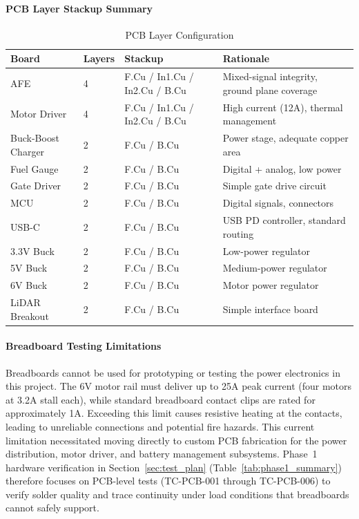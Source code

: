 \paragraph{PCB Layer Stackup Summary}
\begin{table}[H]
\centering
\caption{PCB Layer Configuration}
\label{tab:layer-stackup}
\begin{tabular}{@{}llll@{}}
\toprule
\textbf{Board} & \textbf{Layers} & \textbf{Stackup} & \textbf{Rationale} \\
\midrule
AFE & 4 & F.Cu / In1.Cu / In2.Cu / B.Cu & Mixed-signal integrity, ground plane coverage \\
Motor Driver & 4 & F.Cu / In1.Cu / In2.Cu / B.Cu & High current (12A), thermal management \\
\midrule
Buck-Boost Charger & 2 & F.Cu / B.Cu & Power stage, adequate copper area \\
Fuel Gauge & 2 & F.Cu / B.Cu & Digital + analog, low power \\
Gate Driver & 2 & F.Cu / B.Cu & Simple gate drive circuit \\
MCU & 2 & F.Cu / B.Cu & Digital signals, connectors \\
USB-C & 2 & F.Cu / B.Cu & USB PD controller, standard routing \\
3.3V Buck & 2 & F.Cu / B.Cu & Low-power regulator \\
5V Buck & 2 & F.Cu / B.Cu & Medium-power regulator \\
6V Buck & 2 & F.Cu / B.Cu & Motor power regulator \\
LiDAR Breakout & 2 & F.Cu / B.Cu & Simple interface board \\
\bottomrule
\end{tabular}
\end{table}

\paragraph{Breadboard Testing Limitations}

Breadboards cannot be used for prototyping or testing the power electronics in this project. The 6V motor rail must deliver up to 25A peak current (four motors at 3.2A stall each), while standard breadboard contact clips are rated for approximately 1A. Exceeding this limit causes resistive heating at the contacts, leading to unreliable connections and potential fire hazards. This current limitation necessitated moving directly to custom PCB fabrication for the power distribution, motor driver, and battery management subsystems. Phase~1 hardware verification in Section~\ref{sec:test_plan} (Table~\ref{tab:phase1_summary}) therefore focuses on PCB-level tests (TC-PCB-001 through TC-PCB-006) to verify solder quality and trace continuity under load conditions that breadboards cannot safely support.

